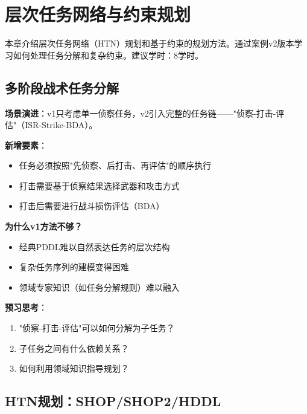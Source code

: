 \chapter{层次任务网络与约束规划}

\begin{levelbox}
本章介绍层次任务网络（HTN）规划和基于约束的规划方法。通过案例v2版本学习如何处理任务分解和复杂约束。建议学时：8学时。
\end{levelbox}

\section{多阶段战术任务分解}

\begin{caseboxB}
\textbf{场景演进}：v1只考虑单一侦察任务，v2引入完整的任务链——"侦察-打击-评估"（ISR-Strike-BDA）。

\textbf{新增要素}：
\begin{itemize}
  \item 任务必须按照"先侦察、后打击、再评估"的顺序执行
  \item 打击需要基于侦察结果选择武器和攻击方式
  \item 打击后需要进行战斗损伤评估（BDA）
\end{itemize}

\textbf{为什么v1方法不够？}
\begin{itemize}
  \item 经典PDDL难以自然表达任务的层次结构
  \item 复杂任务序列的建模变得困难
  \item 领域专家知识（如任务分解规则）难以融入
\end{itemize}

\textbf{预习思考}：
\begin{enumerate}
  \item "侦察-打击-评估"可以如何分解为子任务？
  \item 子任务之间有什么依赖关系？
  \item 如何利用领域知识指导规划？
\end{enumerate}
\end{caseboxB}

\section{HTN规划：SHOP/SHOP2/HDDL}

